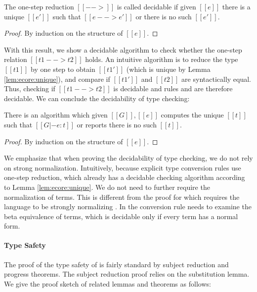 \begin{lem}\label{lem:ecore:unique}
	The one-step reduction $[[-->]]$ is called decidable if 
given $[[e]]$ there is a unique $[[e']]$ such that $[[e --> e']]$ or
there is no such $[[e']]$.
\end{lem}

\begin{proof}
	By induction on the structure of $[[e]]$.
\end{proof}

With this result, we show a decidable algorithm to check whether
the one-step relation $[[t1 --> t2]]$ holds. An intuitive algorithm is to
reduce the type $[[t1]]$ by one step to obtain $[[t1']]$ (which is
unique by Lemma \ref{lem:ecore:unique}), and compare if $[[t1']]$ and
$[[t2]]$ are syntactically equal. Thus, checking if $[[t1 --> t2]]$ is
decidable and rules  and  are
therefore decidable. We can conclude the decidability of type
checking:

\begin{thm}\label{lem:ecore:decide}
	There is an algorithm which given $[[G]], [[e]]$ computes the unique
$[[t]]$ such that $[[G |- e:t]]$ or reports there is no such $[[t]]$.
\end{thm}

\begin{proof}
	By induction on the structure of $[[e]]$.
\end{proof}

We emphasize that when proving the decidability of type checking, we
do not rely on strong normalization. Intuitively, because
explicit type conversion rules use one-step reduction, which already
has a decidable checking algorithm according to Lemma
\ref{lem:ecore:unique}. We do not need to further require the
normalization of terms. This is different from the proof for \cc which
requires the language to be strongly normalizing
\cite{pts:normalize}. In \cc the conversion rule needs to examine
the beta equivalence of terms, which is decidable only if every term
has a normal form.

\paragraph{Type Safety}
The proof of the type safety of \ecore is fairly standard by subject
reduction and progress theorems. The subject reduction proof relies on
the substitution lemma. We give the proof sketch of related lemmas and
theorems as follows:

